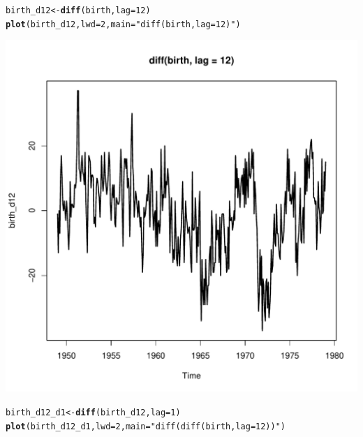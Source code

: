 \documentclass[10pt]{article}\usepackage[]{graphicx}\usepackage[]{color}
\makeatletter
\def\maxwidth{ %
  \ifdim\Gin@nat@width>\linewidth
    \linewidth
  \else
    \Gin@nat@width
  \fi
}
\newcommand{\hlnum}[1]{\textcolor[rgb]{0.686,0.059,0.569}{#1}}%
\newcommand{\hlstr}[1]{\textcolor[rgb]{0.192,0.494,0.8}{#1}}%
\newcommand{\hlstd}[1]{\textcolor[rgb]{0.345,0.345,0.345}{#1}}%
\newcommand{\hlkwb}[1]{\textcolor[rgb]{0.69,0.353,0.396}{#1}}%
\newcommand{\hlkwc}[1]{\textcolor[rgb]{0.333,0.667,0.333}{#1}}%
\newcommand{\hlkwd}[1]{\textcolor[rgb]{0.737,0.353,0.396}{\textbf{#1}}}%
\newenvironment{kframe}{%
 \def\at@end@of@kframe{}%
 \ifinner\ifhmode%
  \def\at@end@of@kframe{\end{minipage}}%
  \begin{minipage}{\columnwidth}%
 \fi\fi%
 \def\FrameCommand##1{\hskip\@totalleftmargin \hskip-\fboxsep
 \colorbox{shadecolor}{##1}\hskip-\fboxsep
     \hskip-\linewidth \hskip-\@totalleftmargin \hskip\columnwidth}%
 \MakeFramed {\advance\hsize-\width
   \@totalleftmargin\z@ \linewidth\hsize
   \@setminipage}}%
 {\par\unskip\endMakeFramed%
 \at@end@of@kframe}
\newenvironment{knitrout}{}{} %
\makeatother
\begin{document}
\begin{knitrout}
\color{fgcolor}\begin{kframe}
\begin{alltt}
\hlstd{birth_d12} \hlkwb{<-} \hlkwd{diff}\hlstd{(birth,} \hlkwc{lag} \hlstd{=} \hlnum{12}\hlstd{)}
\hlkwd{plot}\hlstd{(birth_d12,}\hlkwc{lwd} \hlstd{=} \hlnum{2}\hlstd{,}\hlkwc{main} \hlstd{=} \hlstr{"diff(birth, lag = 12)"}\hlstd{)}
\end{alltt}
\end{kframe}
\includegraphics[width=\maxwidth]{figure/unnamed-chunk-3-1} 
\begin{kframe}\begin{alltt}
\hlstd{birth_d12_d1} \hlkwb{<-} \hlkwd{diff}\hlstd{(birth_d12,}\hlkwc{lag} \hlstd{=} \hlnum{1}\hlstd{)}
\hlkwd{plot}\hlstd{(birth_d12_d1,}\hlkwc{lwd} \hlstd{=} \hlnum{2}\hlstd{,}\hlkwc{main} \hlstd{=} \hlstr{"diff(diff(birth, lag = 12))"}\hlstd{)}
\end{alltt}
\end{kframe}

\end{knitrout}
\end{document}
